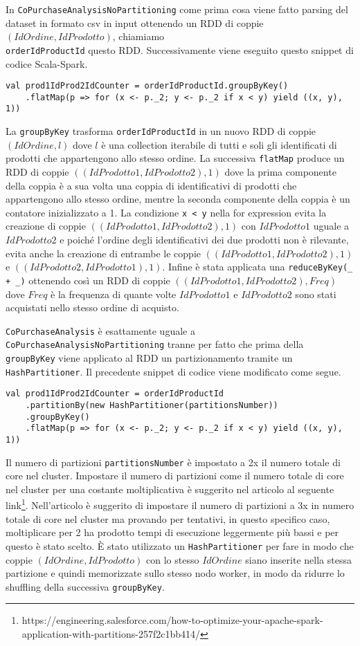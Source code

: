\documentclass{article}
\begin{document}
In \verb|CoPurchaseAnalysisNoPartitioning| come prima cosa viene fatto parsing del dataset in formato csv in input ottenendo un RDD di coppie $(IdOrdine, IdProdotto)$, chiamiamo\\ \verb|orderIdProductId| questo RDD. Successivamente viene eseguito questo snippet di codice Scala-Spark.
\begin{verbatim}
val prod1IdProd2IdCounter = orderIdProductId.groupByKey()
    .flatMap(p => for (x <- p._2; y <- p._2 if x < y) yield ((x, y), 1))
\end{verbatim}
La \verb|groupByKey| trasforma \verb|orderIdProductId| in un nuovo RDD di coppie $(IdOrdine, l)$ dove $l$ è una collection iterabile di tutti e soli gli identificati di prodotti che appartengono allo stesso ordine.
La successiva \verb|flatMap| produce un RDD di coppie $((IdProdotto1, IdProdotto2), 1)$ dove la prima componente della coppia è a sua volta una coppia di identificativi di prodotti che appartengono allo stesso ordine, mentre la seconda componente della coppia è un contatore inizializzato a 1.
La condizione \verb|x < y| nella for expression evita la creazione di coppie $((IdProdotto1, IdProdotto2), 1)$ con $IdProdotto1$ uguale a $IdProdotto2$ e poiché l'ordine degli identificativi dei due prodotti non è rilevante, evita anche la creazione di entrambe le coppie $((IdProdotto1, IdProdotto2), 1)$ e $((IdProdotto2, IdProdotto1), 1)$.
Infine è stata applicata una \verb|reduceByKey(_ + _)| ottenendo così un RDD di coppie $((IdProdotto1, IdProdotto2), Freq)$ dove $Freq$ è la frequenza di quante volte $IdProdotto1$ e $IdProdotto2$ sono stati acquistati nello stesso ordine di acquisto.

\verb|CoPurchaseAnalysis| è esattamente uguale a \verb|CoPurchaseAnalysisNoPartitioning| tranne per fatto che prima della \verb|groupByKey| viene applicato al RDD un partizionamento tramite un \verb|HashPartitioner|. Il precedente snippet di codice viene modificato come segue.
\newpage
\begin{verbatim}
val prod1IdProd2IdCounter = orderIdProductId
    .partitionBy(new HashPartitioner(partitionsNumber))
    .groupByKey()
    .flatMap(p => for (x <- p._2; y <- p._2 if x < y) yield ((x, y), 1))
\end{verbatim}
Il numero di partizioni \verb|partitionsNumber| è impostato a 2x il numero totale di core nel cluster.
Impostare il numero di partizioni come il numero totale di core nel cluster per una costante moltiplicativa è suggerito nel articolo al seguente link\footnote{https://engineering.salesforce.com/how-to-optimize-your-apache-spark-application-with-partitions-257f2c1bb414/}.
Nell'articolo è suggerito di impostare il numero di partizioni a 3x in numero totale di core nel cluster ma provando per tentativi, in questo specifico caso, moltiplicare per 2 ha prodotto tempi di esecuzione leggermente più bassi e per questo è stato scelto.
È stato utilizzato un \verb|HashPartitioner| per fare in modo che coppie $(IdOrdine, IdProdotto)$ con lo stesso $IdOrdine$ siano inserite nella stessa partizione e quindi memorizzate sullo stesso nodo worker, in modo da ridurre lo shuffling della successiva \verb|groupByKey|.
\end{document}
